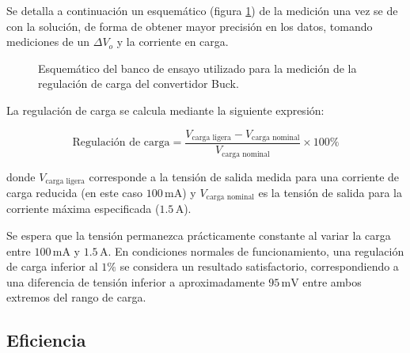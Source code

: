 \documentclass[]{article}
\begin{document}
	
	Se detalla a continuación un esquemático (figura \ref{fig:esquematico_med_reg_carga}) de la medición una vez se de con la solución, de forma de obtener mayor precisión en los datos, tomando mediciones de un $\Delta V_o$ y la corriente en carga.
	
\begin{figure}[H]
	\centering
{}
\caption{Esquemático del banco de ensayo utilizado para la medición de la regulación de carga del convertidor Buck.}
\label{fig:esquematico_med_reg_carga}
\end{figure}


La regulación de carga se calcula mediante la siguiente expresión:

\begin{equation}
	\text{Regulación de carga} =
	\frac{V_{\text{carga ligera}}-V_{\text{carga nominal}}}
	{V_{\text{carga nominal}}}
	\times 100 \% \label{eq:reg_carga}
\end{equation}

donde $V_{\text{carga ligera}}$ corresponde a la tensión de salida medida para una corriente de carga reducida (en este caso $100\,\mathrm{mA}$) y $V_{\text{carga nominal}}$ es la tensión de salida para la corriente máxima especificada ($1.5\,\mathrm{A}$).

Se espera que la tensión permanezca prácticamente constante al variar la carga entre $100\,\mathrm{mA}$ y $1.5\,\mathrm{A}$. En condiciones normales de funcionamiento, una regulación de carga inferior al $1 \% $  se considera un resultado satisfactorio, correspondiendo a una diferencia de tensión inferior a aproximadamente $95\,\mathrm{mV}$ entre ambos extremos del rango de carga.

\subsection{Eficiencia}
\end{document}
